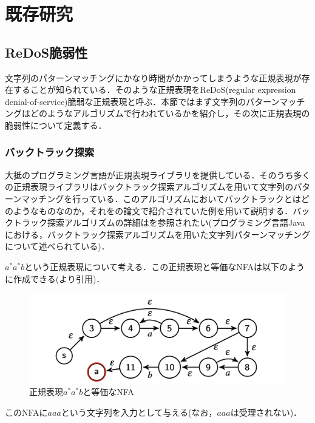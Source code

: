 \documentclass[a4paper, 12pt, dvipdfmx, uplatex]{jsreport}
\begin{document}
\chapter{既存研究}


\section{ReDoS脆弱性}
文字列のパターンマッチングにかなり時間がかかってしまうような正規表現が存在することが知られている．そのような正規表現をReDoS(regular expression denial-of-service)脆弱な正規表現と呼ぶ．本節ではまず文字列のパターンマッチングはどのようなアルゴリズムで行われているかを紹介し，その次に正規表現の脆弱性について定義する．

\subsection{バックトラック探索}
大抵のプログラミング言語が正規表現ライブラリを提供している．そのうち多くの正規表現ライブラリはバックトラック探索アルゴリズムを用いて文字列のパターンマッチングを行っている．このアルゴリズムにおいてバックトラックとはどのようなものなのか，それを\cite{javascript}の論文で紹介されていた例を用いて説明する．バックトラック探索アルゴリズムの詳細は\cite{java}を参照されたい(プログラミング言語Javaにおける，バックトラック探索アルゴリズムを用いた文字列パターンマッチングについて述べられている)．

$a^*a^*b$という正規表現について考える．この正規表現と等価なNFAは以下のように作成できる(\cite{javascript}より引用)．

\begin{figure}[H] %
  \centering
  \includegraphics[width=0.8\linewidth]{../figures/a*a*b.png}
  \caption{正規表現$a^*a^*b$と等価なNFA\label{ラベル名}}
\end{figure}


このNFAに$aaa$という文字列を入力として与える(なお，$aaa$は受理されない)．
\end{document}
